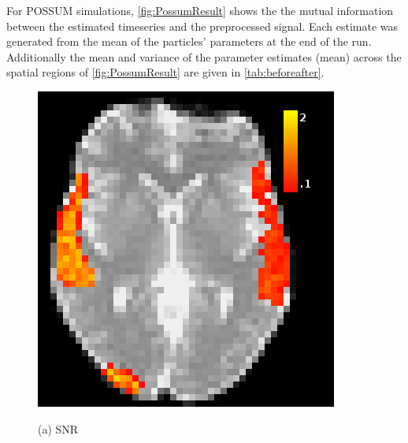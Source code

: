 \documentclass{article}
\begin{document}
For POSSUM simulations, \autoref{fig:PossumResult} shows the
the mutual information between the estimated timeseries and the 
preprocessed signal. Each estimate was generated from the 
mean of the particles' parameters at the end of the run. 
Additionally the mean and variance of the parameter estimates
(mean) across the spatial regions of \autoref{fig:PossumResult} are
given in \autoref{tab:beforeafter}.

\begin{figure}[htb]
\begin{minipage}[b]{.5\linewidth}
  \centering
  \centerline{\includegraphics[width=\textwidth]{snr_hm.png}}
  \centerline{(a) SNR}\medskip
\end{minipage}
\hfill
\begin{minipage}[b]{.49\linewidth}
  \centering

\end{minipage}
\end{figure}
\end{document}
